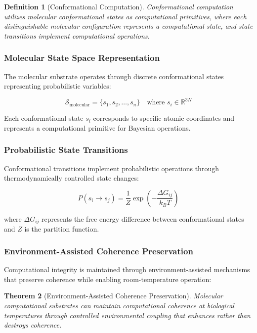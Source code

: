 \documentclass[12pt,a4paper]{article}
\newtheorem{theorem}{Theorem}[section]
\newtheorem{definition}[theorem]{Definition}
\begin{document}
\begin{definition}[Conformational Computation]
Conformational computation utilizes molecular conformational states as computational primitives, where each distinguishable molecular configuration represents a computational state, and state transitions implement computational operations.
\end{definition}

\subsubsection{Molecular State Space Representation}

The molecular substrate operates through discrete conformational states representing probabilistic variables:

\begin{equation}
\mathcal{S}_{\text{molecular}} = \{s_1, s_2, \ldots, s_n\} \quad \text{where } s_i \in \mathbb{R}^{3N}
\end{equation}

Each conformational state $s_i$ corresponds to specific atomic coordinates and represents a computational primitive for Bayesian operations.

\subsubsection{Probabilistic State Transitions}

Conformational transitions implement probabilistic operations through thermodynamically controlled state changes:

\begin{equation}
P(s_i \rightarrow s_j) = \frac{1}{Z} \exp\left(-\frac{\Delta G_{ij}}{k_B T}\right)
\end{equation}

where $\Delta G_{ij}$ represents the free energy difference between conformational states and $Z$ is the partition function.

\subsubsection{Environment-Assisted Coherence Preservation}

Computational integrity is maintained through environment-assisted mechanisms that preserve coherence while enabling room-temperature operation:

\begin{theorem}[Environment-Assisted Coherence Preservation]
Molecular computational substrates can maintain computational coherence at biological temperatures through controlled environmental coupling that enhances rather than destroys coherence.
\end{theorem}
\end{document}
